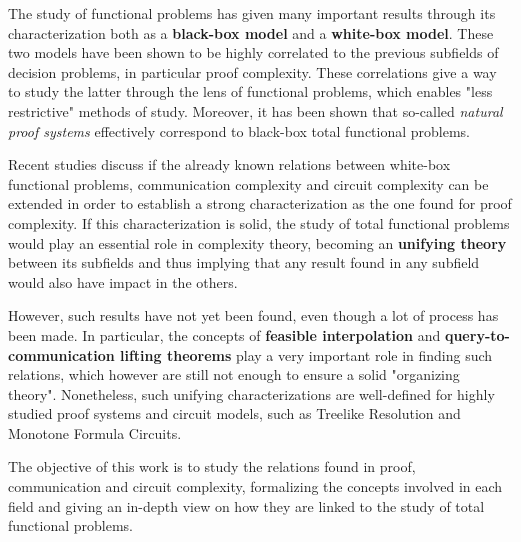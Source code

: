 The study of functional problems has given many important results through its characterization both as a \textbf{black-box model} and a \textbf{white-box model}. These two models have been shown to be highly correlated to the previous subfields of decision problems, in particular proof complexity. These correlations give a way to study the latter through the lens of functional problems, which enables "less restrictive" methods of study. Moreover, it has been shown that so-called \textit{natural proof systems} effectively correspond to black-box total functional problems.

Recent studies discuss if the already known relations between white-box functional problems, communication complexity and circuit complexity can be extended in order to establish a strong characterization as the one found for proof complexity. If this characterization is solid, the study of total functional problems would play an essential role in complexity theory, becoming an \textbf{unifying theory} between its subfields and thus implying that any result found in any subfield would also have impact in the others.

However, such results have not yet been found, even though a lot of process has been made. In particular, the concepts of \textbf{feasible interpolation} and \textbf{query-to-communication lifting theorems} play a very important role in finding such relations, which however are still not enough to ensure a solid "organizing theory". Nonetheless, such unifying characterizations are well-defined for highly studied proof systems and circuit models, such as Treelike Resolution and Monotone Formula Circuits.

The objective of this work is to study the relations found in proof, communication and circuit complexity, formalizing the concepts involved in each field and giving an in-depth view on how they are linked to the study of total functional problems.

\cleardoublepage